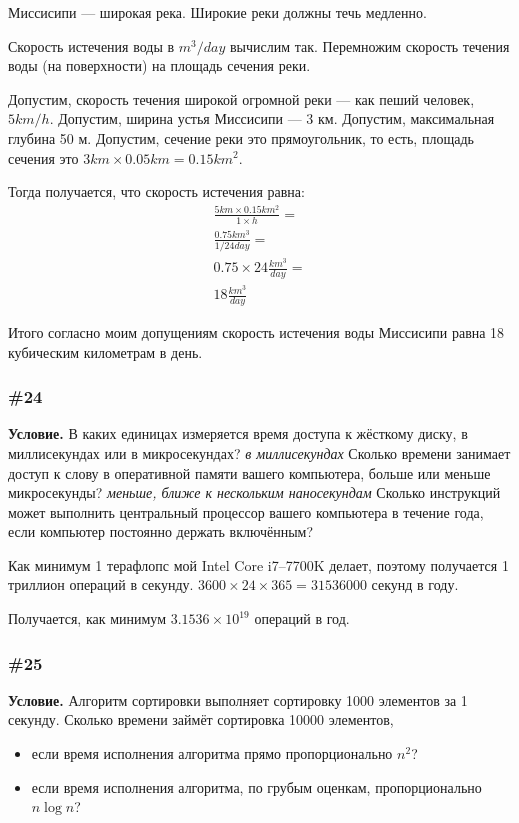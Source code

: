 \documentclass{article}
\begin{document}
Миссисипи --- широкая река.
Широкие реки должны течь медленно.

Скорость истечения воды в $m^3/day$ вычислим так.
Перемножим скорость течения воды (на поверхности) на площадь сечения реки.

Допустим, скорость течения широкой огромной реки --- как пеший человек, $5 km/h$.
Допустим, ширина устья Миссисипи --- 3 км.
Допустим, максимальная глубина 50 м.
Допустим, сечение реки это прямоугольник, то есть, площадь сечения это $3 km \times 0.05 km = 0.15 km^2$.

Тогда получается, что скорость истечения равна: 
\begin{eqnarray}
    \frac{5 km \times 0.15 km^2}{1 \times h} =\\
    \frac{0.75 km^3}{1/24 day} =\\
    0.75 \times 24 \frac{km^3}{day} =\\
    18 \frac{km^3}{day}
\end{eqnarray}    

Итого согласно моим допущениям скорость истечения воды Миссисипи равна 18 кубическим километрам
в день.

\subsubsection{\#24}

\textbf{Условие.}
В каких единицах измеряется время доступа к жёсткому диску, в миллисекундах или в микросекундах?
\textit{в миллисекундах}
Сколько времени занимает доступ к слову в оперативной памяти вашего компьютера,
больше или меньше микросекунды?
\textit{меньше, ближе к нескольким наносекундам}
Сколько инструкций может выполнить центральный процессор вашего компьютера в течение года,
если компьютер постоянно держать включённым?

Как минимум 1 терафлопс мой Intel Core i7--7700K делает, поэтому
получается 1 триллион операций в секунду.
$3600 \times 24 \times 365 = 31536000$ секунд в году.

Получается, как минимум $3.1536\times 10^{19}$ операций в год.

\subsubsection{\#25}

\textbf{Условие.}
Алгоритм сортировки выполняет сортировку 1000 элементов за 1 секунду.
Сколько времени займёт сортировка 10000 элементов,
\begin{itemize}
    \item если время исполнения алгоритма прямо пропорционально $n^2$?
    \item если время исполнения алгоритма, по грубым оценкам, пропорционально $n\log{n}$?
\end{itemize}
\end{document}
